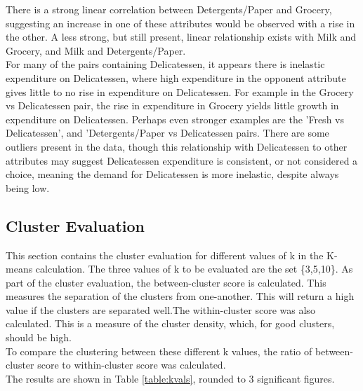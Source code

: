 \documentclass{article}
\begin{document}
There is a strong linear correlation between Detergents/Paper and Grocery, suggesting an increase in one of these attributes
would be observed with a rise in the other. A less strong, but still present, linear relationship exists with Milk and Grocery, 
and Milk and Detergents/Paper.\\ 

For many of the pairs containing Delicatessen, it appears there is inelastic expenditure on Delicatessen, where high expenditure in the
opponent attribute gives little to no rise in expenditure on Delicatessen. For example in the Grocery vs Delicatessen pair, the rise in
expenditure in Grocery yields little growth in expenditure on Delicatessen. Perhaps even stronger examples are the 'Fresh vs Delicatessen',
and 'Detergents/Paper vs Delicatessen pairs. There are some outliers present in the data, though this relationship with Delicatessen to 
other attributes may suggest Delicatessen expenditure is consistent, or not considered a choice, meaning the demand for Delicatessen is 
more inelastic, despite always being low.\\


\subsection{Cluster Evaluation} 

\noindent This section contains the cluster evaluation for different values of k in the K-means calculation. The three values of k to be evaluated
are the set \{3,5,10\}. As part of the cluster evaluation, the between-cluster score is calculated. This measures the separation of the clusters from one-another.
This will return a high value if the clusters are separated well.The within-cluster score was also calculated. This is a measure of the cluster density, which, for good clusters, should be high.\\
To compare the clustering between these different k values, the ratio of between-cluster score to within-cluster score was calculated.\\
The results are shown in Table \ref{table:kvals}, rounded to 3 significant figures.
\vspace{4mm}
\end{document}
